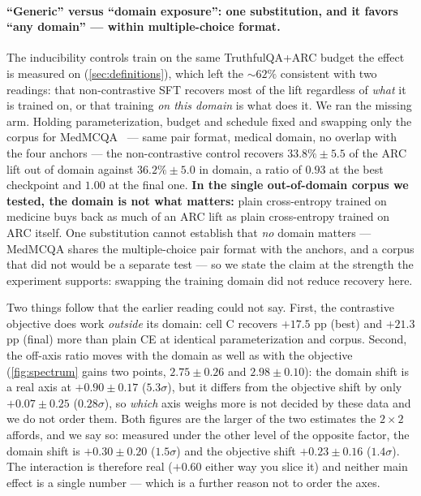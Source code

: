\paragraph{``Generic'' versus ``domain exposure'': one substitution, and it favors
``any domain'' --- within multiple-choice format.}
The inducibility controls train on the same TruthfulQA+ARC budget the effect is
measured on (\cref{sec:definitions}), which left the ${\sim}62\%$ consistent with two
readings: that non-contrastive SFT recovers most of the lift regardless of \emph{what}
it is trained on, or that training \emph{on this domain} is what does it. We ran the missing arm. Holding
parameterization, budget and schedule fixed and swapping only the corpus for MedMCQA~\citep{MedMCQA}
--- same pair format, medical domain, no overlap with the four anchors --- the
non-contrastive control recovers $33.8\% \pm 5.5$ of the ARC lift out of domain
against $36.2\% \pm 5.0$ in domain, a ratio of $\mathbf{0.93}$ at the best
checkpoint and $\mathbf{1.00}$ at the final one. \textbf{In the single out-of-domain
corpus we tested, the domain is not what matters:} plain cross-entropy trained on
medicine buys back as much of an ARC lift as plain cross-entropy trained on ARC
itself. One substitution cannot establish that \emph{no} domain matters --- MedMCQA
shares the multiple-choice pair format with the anchors, and a corpus that did not
would be a separate test --- so we state the claim at the strength the experiment
supports: swapping the training domain did not reduce recovery here.

Two things follow that the earlier reading could not say. First, the contrastive
objective does work \emph{outside} its domain: cell C recovers $+17.5$ pp (best) and
$+21.3$ pp (final) more than plain CE at identical parameterization and corpus.
Second, the off-axis ratio moves with the domain as well as with the objective
(\cref{fig:spectrum} gains two points, $2.75 \pm 0.26$ and $2.98 \pm 0.10$): the
domain shift is a real axis at $+0.90 \pm 0.17$ ($5.3\sigma$), but it differs from the
objective shift by only $+0.07 \pm 0.25$ ($0.28\sigma$), so \emph{which} axis weighs
more is not decided by these data and we do not order them. Both figures are the
larger of the two estimates the $2\times2$ affords, and we say so: measured under the
other level of the opposite factor, the domain shift is $+0.30 \pm 0.20$ ($1.5\sigma$)
and the objective shift $+0.23 \pm 0.16$ ($1.4\sigma$). The interaction is therefore
real ($+0.60$ either way you slice it) and neither main effect is a single number ---
which is a further reason not to order the axes.

